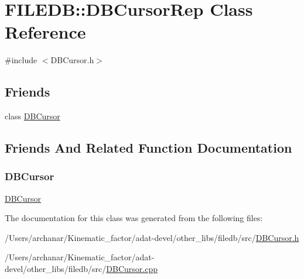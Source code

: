 \hypertarget{classFILEDB_1_1DBCursorRep}{}\section{F\+I\+L\+E\+DB\+:\+:D\+B\+Cursor\+Rep Class Reference}
\label{classFILEDB_1_1DBCursorRep}


{\ttfamily \#include $<$D\+B\+Cursor.\+h$>$}

\subsection*{Friends}
\begin{DoxyCompactItemize}
\item 
class \mbox{\hyperlink{classFILEDB_1_1DBCursorRep_abba58dba404558c3cb4da3d36e1b1bb8}{D\+B\+Cursor}}
\end{DoxyCompactItemize}


\subsection{Friends And Related Function Documentation}
\mbox{\label{classFILEDB_1_1DBCursorRep_abba58dba404558c3cb4da3d36e1b1bb8}} 
\subsubsection{\texorpdfstring{DBCursor}{DBCursor}}
{\footnotesize\ttfamily \mbox{\hyperlink{classFILEDB_1_1DBCursor}{D\+B\+Cursor}}\hspace{0.3cm}{\ttfamily [friend]}}



The documentation for this class was generated from the following files\+:\begin{DoxyCompactItemize}
\item 
/\+Users/archanar/\+Kinematic\+\_\+factor/adat-\/devel/other\+\_\+libs/filedb/src/\mbox{\hyperlink{adat-devel_2other__libs_2filedb_2src_2DBCursor_8h}{D\+B\+Cursor.\+h}}\item 
/\+Users/archanar/\+Kinematic\+\_\+factor/adat-\/devel/other\+\_\+libs/filedb/src/\mbox{\hyperlink{adat-devel_2other__libs_2filedb_2src_2DBCursor_8cpp}{D\+B\+Cursor.\+cpp}}\end{DoxyCompactItemize}
